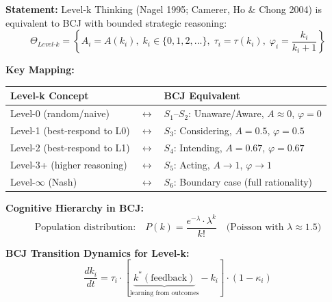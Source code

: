 
\begin{tcolorbox}[colback=green!5!white, colframe=green!75!black,
    title=Theorem BCJ-T27: Level-k Thinking as Special Case]
\textbf{Statement:} Level-k Thinking (Nagel 1995; Camerer, Ho \& Chong 2004) is equivalent to BCJ with bounded strategic reasoning:
\begin{equation}
\Theta_{Level\text{-}k} = \left\{A_i = A(k_i), \; k_i \in \{0, 1, 2, ...\}, \; \tau_i = \tau(k_i), \; \varphi_i = \frac{k_i}{k_i + 1}\right\}
\end{equation}

\textbf{Key Mapping:}
\begin{center}
\begin{tabular}{lcl}
\toprule
\textbf{Level-k Concept} & & \textbf{BCJ Equivalent} \\
\midrule
Level-0 (random/naive) & $\leftrightarrow$ & $S_1$--$S_2$: Unaware/Aware, $A \approx 0$, $\varphi = 0$ \\
Level-1 (best-respond to L0) & $\leftrightarrow$ & $S_3$: Considering, $A = 0.5$, $\varphi = 0.5$ \\
Level-2 (best-respond to L1) & $\leftrightarrow$ & $S_4$: Intending, $A = 0.67$, $\varphi = 0.67$ \\
Level-3+ (higher reasoning) & $\leftrightarrow$ & $S_5$: Acting, $A \to 1$, $\varphi \to 1$ \\
Level-$\infty$ (Nash) & $\leftrightarrow$ & $S_6$: Boundary case (full rationality) \\
\bottomrule
\end{tabular}
\end{center}

\textbf{Cognitive Hierarchy in BCJ:}
\begin{equation}
\text{Population distribution:} \quad P(k) = \frac{e^{-\lambda} \cdot \lambda^k}{k!} \quad \text{(Poisson with } \lambda \approx 1.5\text{)}
\end{equation}

\textbf{BCJ Transition Dynamics for Level-k:}
\begin{equation}
\frac{dk_i}{dt} = \tau_i \cdot \left[\underbrace{k^*(\text{feedback})}_{\text{learning from outcomes}} - k_i\right] \cdot (1 - \kappa_i)
\end{equation}


\end{tcolorbox}
